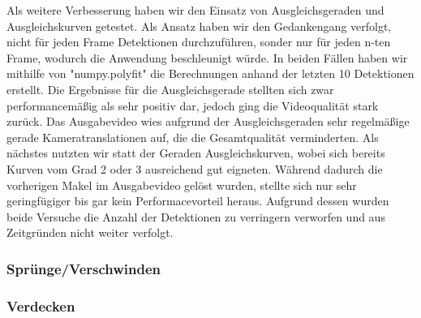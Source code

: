Als weitere Verbesserung haben wir den Einsatz von Ausgleichsgeraden und Ausgleichskurven getestet. Als Ansatz haben wir den Gedankengang verfolgt, nicht für jeden Frame Detektionen durchzuführen, sonder nur für jeden n-ten Frame, wodurch die Anwendung beschleunigt würde. 
In beiden Fällen haben wir mithilfe von "numpy.polyfit" die Berechnungen anhand der letzten 10 Detektionen erstellt. Die Ergebnisse für die Ausgleichsgerade stellten sich zwar performancemäßig als sehr positiv dar, jedoch ging die Videoqualität stark zurück. Das Ausgabevideo wies aufgrund der Ausgleichsgeraden sehr regelmäßige gerade Kameratranslationen auf, die die Gesamtqualität verminderten.
Als nächstes nutzten wir statt der Geraden Ausgleichskurven, wobei sich bereits Kurven vom Grad 2 oder 3 ausreichend gut eigneten. Während dadurch die vorherigen Makel im Ausgabevideo gelöst wurden, stellte sich nur sehr geringfügiger bis gar kein Performacevorteil heraus. Aufgrund dessen wurden beide Versuche die Anzahl der Detektionen zu verringern verworfen und aus Zeitgründen nicht weiter verfolgt.




\subsubsection*{Sprünge/Verschwinden}
\subsubsection*{Verdecken}


